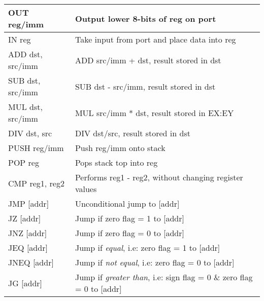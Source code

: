 \documentclass[a4paper, 11pt]{report}
\begin{document}
\begin{center}
\begin{tabular}{|l|p{27em}|}
        \hline
        OUT reg/imm          & Output lower 8-bits of reg on port                                                                  \\
        \hline
        IN reg               & Take input from port and place data into reg                                        \\
        \hline
        ADD dst, src/imm     & ADD src/imm + dst, result stored in dst                                             \\
        \hline
        SUB dst, src/imm     & SUB dst - src/imm, result stored in dst                                             \\
        \hline
        MUL dst, src/imm     & MUL src/imm * dst, result stored in EX:EY                                           \\
        \hline
        DIV dst, src         & DIV dst/src, result stored in dst                                                   \\
        \hline
        PUSH reg/imm         & Push reg/imm onto stack                                                             \\
        \hline
        POP reg              & Pops stack top into reg                                                             \\
        \hline
        CMP reg1, reg2       & Performs reg1 - reg2, without changing register values                              \\
        \hline
        JMP [addr]           & Unconditional jump to [addr]                                                        \\
        \hline
        JZ [addr]            & Jump if zero flag = 1 to [addr]                                                     \\
        \hline
        JNZ [addr]           & Jump if zero flag = 0 to [addr]                                                     \\
        \hline
        JEQ [addr]           & Jump if \emph{equal}, i.e: zero flag = 1 to [addr]                                  \\
        \hline
        JNEQ [addr]          & Jump if \emph{not equal}, i.e: zero flag = 0 to [addr]                              \\
        \hline
        JG [addr]            & Jump if \emph{greater than}, i.e: sign flag = 0 \& zero flag = 0 to [addr]          \\

\end{tabular}
\end{center}
\end{document}
